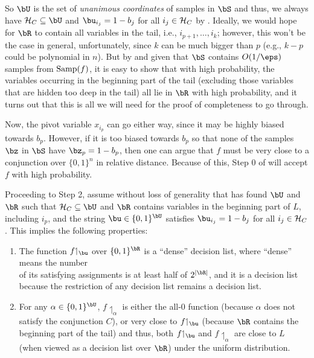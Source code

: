 \documentclass[11pt]{article}
\theoremstyle{definition}
\begin{document}
\noindent So $\bU$ is the set of \emph{unanimous coordinates} of 
  samples in $\bS$ and thus, we always have ${\cal H}_C\subseteq \bU$ and $\bu_{i_j}=1-b_j$ for all $i_j\in {\cal H}_C$
  by . 
Ideally, we would hope for $\bR$ to contain all variables in the tail, i.e., $i_{p+1},\ldots,i_k$; however, this won't be the case in general, unfortunately, since $k$ can be much bigger than $p$ (e.g., $k-p$ could be polynomial in $n$). But by  and given that $\bS$ contains $O(1/\eps)$ samples from $\mathrm{Samp}(f)$, it is easy to show that with high probability, the variables occurring in the beginning part of the tail (excluding those variables that are hidden too deep in the tail) all lie in $\bR$ with high probability, and it turns out that this is all we will need for the proof of completeness to go through.


Now, the pivot variable $x_{i_p}$ can go either way, since 
  it may be highly biased towards $b_{p}$.
However, if it is too biased towards $b_{p}$ so that
  none of the samples $\bz$ in $\bS$ have $\bz_p=1-b_p$, then one can argue that $f$ must be very close
  to a conjunction over $\{0,1\}^n$ in relative distance.
Because of this, Step $0$ of 
  will accept $f$ with high probability.


Proceeding to Step 2, assume without loss of generality that
   has found $\bU$ and $\bR$ such that ${\cal H}_C\subseteq \bU$ and $\bR$ contains variables in the beginning part of $L$, including $i_p$, and the string $\bu\in \{0,1\}^{\bU}$ satisfies $\bu_{i_j}=1-b_j$ for all $i_j\in {\cal H}_C$.
This implies the following properties:
\begin{flushleft}\begin{enumerate}
\item The function $f{\upharpoonleft_{\bu}}$ over $\{0,1\}^{\bR}$  is a ``dense'' decision list, where 
  ``dense'' means the number\\ of its satisfying assignments 
  is at least half of $2^{|\bR|}$, and it is a decision list
  because the restriction of any decision list remains a decision list.
\item For any $\alpha\in \{0,1\}^{\bU}$, $f{\upharpoonleft_{\alpha}}$ is either the all-$0$ function
  (because $\alpha$ does not satisfy the conjunction $C$), or very close to $f{\upharpoonleft_{\bu}}$  (because $\bR$ contains the beginning part of the tail) and thus, both $f{\upharpoonleft_{\bu}}$
  and $f{\upharpoonleft_{\alpha}}$ are close to $L$ (when viewed as a decision list over $\bR$) under the uniform distribution.
\end{enumerate}\end{flushleft}
\end{document}
